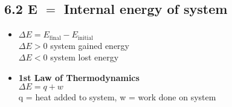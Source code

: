 \subsection{6.2 E $=$ Internal energy of system}
    \begin{itemize}
        \item $\Delta E = E_\text{final} - E_\text{initial}$\\
            $\Delta E > 0$ system gained energy\\
            $\Delta E < 0$ system lost energy
        \item \textbf{1st Law of Thermodynamics}\\
            $\Delta E = q + w$\\ 
            q = heat added to system, w = work done on system
    \end{itemize}
    \vspace*{0.0em}